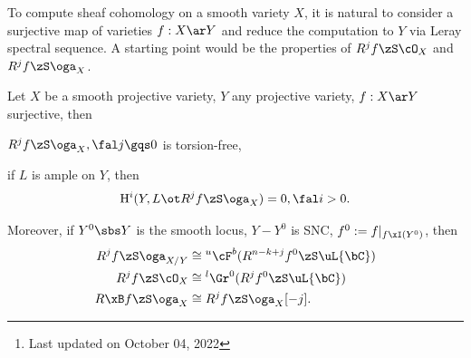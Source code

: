 \documentclass[a4paper, twoside]{article}
\title{\tbf{Kollar1986}}
\author{\tbf{Notes} by Cong Wen, 10/2022}
\date{}
\begin{document}
\maketitle
\thispagestyle{empty}
\begin{abstract}
	This is my self-use notes\footnote{Last updated on October 04, 2022} on \cite{Kollar1986-1,Kollar1986-2}. The original papers have been very well written so this note really is only for personal use. Please reach out if you find anything incorrect.
\end{abstract}
\tableofcontents


\begin{mtv}
	To compute sheaf cohomology on a smooth variety $X$, it is natural to consider a surjective map of varieties $f:X\ar Y$ and reduce the computation to $Y$ via Leray spectral sequence. A starting point would be the properties of $R^{j}f\zS\cO_{X}$ and $R^{j}f\zS\oga_{X}$.
\end{mtv}

\begin{thm}
	Let $X$ be a smooth projective variety, $Y$ any projective variety, $f:X\ar Y$ surjective, then
	\begin{enr}
		\item $R^{j}f\zS\oga_{X}, \fal j\gqs0$ is torsion-free,
		\item if $L$ is ample on $Y$, then
		\[
			\mathrm{H}_{}^{i}(Y,L\ot R^{j}f\zS\oga_{X})=0, \fal i>0.
		\]
	\end{enr}
	Moreover, if $Y^{0}\sbs Y$ is the smooth locus, $Y-Y^{0}$ is SNC, $f^{0}:=f|_{f\xI(Y^{0})}$, then
	\begin{align*}
		R^{j}f\zS\oga_{X/Y}&\cong{}^{u}\cF^{b}(R^{n-k+j}f^{0}\zS\uL{\bC})\\
	  	R^{j}f\zS\cO_{X}&\cong {}^{l}\Gr^{0}(R^{j}f^{0}\zS\uL{\bC})\\
		R\xB f\zS\oga_{X}&\cong R^{j}f\zS\oga_{X}[-j].
	\end{align*}

\end{thm}






\end{document}
